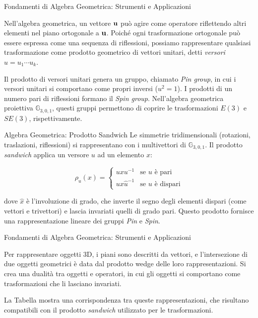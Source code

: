 \begin{frame}{Fondamenti di Algebra Geometrica: Strumenti e Applicazioni}

    Nell’algebra geometrica, un vettore \( \mathbf{u} \) può agire come operatore riflettendo 
    altri elementi nel piano ortogonale a \( \mathbf{u} \). 
    Poiché ogni trasformazione ortogonale può essere espressa come una sequenza di riflessioni, 
    possiamo rappresentare qualsiasi trasformazione come prodotto geometrico di vettori 
    unitari, detti \textit{versori}  \( u = u_1 \cdots u_k \).

    Il prodotto di versori unitari genera un gruppo, chiamato \textit{Pin group}, 
    in cui i versori unitari si comportano come propri inversi (\( u^2 = 1 \)). 
    I prodotti di un numero pari di riflessioni formano il \textit{Spin group}. 
    Nell’algebra geometrica proiettiva \( \mathbb{G}_{3,0,1} \), questi gruppi 
    permettono di coprire le trasformazioni \( E(3) \) e \( SE(3) \), rispettivamente.
\end{frame}

\begin{frame}{Algebra Geometrica: Prodotto Sandwich}
    Le simmetrie tridimensionali (rotazioni, traslazioni, riflessioni) si rappresentano 
    con i multivettori di \( \mathbb{G}_{3,0,1} \). Il prodotto \textit{sandwich} applica 
    un versore \( u \) ad un elemento \( x \):

    \begin{equation}
        \rho_u(x) = 
        \begin{cases}
            u x u^{-1} & \text{se } u \text{ è pari} \\
            u x \hat{u}^{-1} & \text{se } u \text{ è dispari}
        \end{cases}
    \label{eq:4}
    \end{equation}

    dove \( \hat{x} \) è l'involuzione di grado, che inverte il segno degli elementi 
    dispari (come vettori e trivettori) e lascia invariati quelli di grado pari. 
    Questo prodotto fornisce una rappresentazione lineare dei gruppi \textit{Pin} e 
    \textit{Spin}.

\end{frame}

\begin{frame}{Fondamenti di Algebra Geometrica: Strumenti e Applicazioni}

    Per rappresentare oggetti 3D, i piani sono descritti da vettori, e l'intersezione 
    di due oggetti geometrici è data dal prodotto wedge delle loro rappresentazioni. 
    Si crea una dualità tra oggetti e operatori, in cui gli oggetti 
    si comportano come trasformazioni che li lasciano invariati.

    La Tabella mostra una corrispondenza tra queste rappresentazioni, che risultano 
    compatibili con il prodotto \textit{sandwich} utilizzato per le trasformazioni.

\end{frame}

